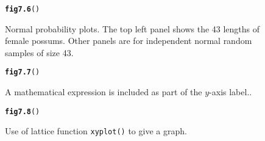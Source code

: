 \documentclass[12pt, a4paper,  BCOR=8.25mm, DIV=15]{scrartcl}\usepackage[]{graphicx}\usepackage[]{color}
\makeatletter
\newcommand{\hlstd}[1]{\textcolor[rgb]{0.345,0.345,0.345}{#1}}%
\newcommand{\hlkwd}[1]{\textcolor[rgb]{0.737,0.353,0.396}{\textbf{#1}}}%
\newenvironment{kframe}{%
 \def\at@end@of@kframe{}%
 \ifinner\ifhmode%
  \def\at@end@of@kframe{\end{minipage}}%
  \begin{minipage}{\columnwidth}%
 \fi\fi%
 \def\FrameCommand##1{\hskip\@totalleftmargin \hskip-\fboxsep
 \colorbox{shadecolor}{##1}\hskip-\fboxsep
     \hskip-\linewidth \hskip-\@totalleftmargin \hskip\columnwidth}%
 \MakeFramed {\advance\hsize-\width
   \@totalleftmargin\z@ \linewidth\hsize
   \@setminipage}}%
 {\par\unskip\endMakeFramed%
 \at@end@of@kframe}
\newenvironment{knitrout}{}{} %
\newcommand{\txtt}[1]{{\texttt{#1}}}
\makeatother
\begin{document}
\begin{figure}[ht]
\begin{knitrout}
\color{fgcolor}\begin{kframe}
\begin{alltt}
\hlkwd{fig7.6}\hlstd{()}
\end{alltt}


{\ttfamily\noindent\bfseries{}}\end{kframe}
\end{knitrout}
\vspace*{-12pt}

      \caption{Normal probability plots. The top left panel shows the 43 lengths
of female possums. Other panels are for independent normal
random samples of size 43.\label{fig:np-plots}}
\end{figure}

\begin{figure}[ht]
\vspace*{-6pt}
\begin{knitrout}
\color{fgcolor}\begin{kframe}
\begin{alltt}
\hlkwd{fig7.7}\hlstd{()}
\end{alltt}
\end{kframe}
\end{knitrout}
\caption{A mathematical expression is included as part of the
  $y$-axis label.\label{fig:area}.}
\end{figure}

\begin{figure}[ht]
\begin{knitrout}
\color{fgcolor}\begin{kframe}
\begin{alltt}
\hlkwd{fig7.8}\hlstd{()}
\end{alltt}


{\ttfamily\noindent\bfseries{}}\end{kframe}
\end{knitrout}
\caption{Use of lattice function \txtt{xyplot()} to give a graph.
  \label{fig:lat-gph}}
\end{figure}
\end{document}
